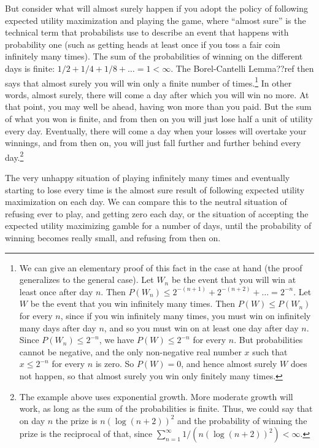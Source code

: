 But consider what will almost surely happen if you adopt the policy of following expected utility maximization and playing the game, where ``almost sure'' is 
the technical term that probabilists use to describe an event that happens with probability one (such as getting heads at least 
once if you toss a fair coin infinitely many times). The sum of the probabilities of winning on the different days is finite: 
$1/2+1/4+1/8+\dots=1<\infty$. The Borel-Cantelli Lemma??ref then says that almost surely you will win only a finite number of times.\footnote{We 
can give an elementary proof of this fact in the case at hand (the proof generalizes to the general case). Let $W_n$ be the event that you will win at least once after day $n$. 
Then $P(W_n)\le 2^{-(n+1)}+2^{-(n+2)}+\dots = 2^{-n}$. Let $W$ be the event that you win infinitely many times. Then $P(W)\le P(W_n)$ for
every $n$, since if you win infinitely many times, you must win on infinitely many days after day $n$, and so you must win on at least one
day after day $n$. Since $P(W_n) \le 2^{-n}$, we have $P(W) \le 2^{-n}$ for every $n$. But probabilities cannot be negative, and the only 
non-negative real number $x$ such that $x \le 2^{-n}$ for every $n$ is zero. So $P(W)=0$, and hence almost surely $W$ does not happen,
so that almost surely you win only finitely many times.} In other words, almost surely, there will come a day after which you will win no more. At that point, you may well be ahead,
having won more than you paid. But the sum of what you won is finite, and from then on you will just lose half a unit of utility every 
day. Eventually, there will come a day when your losses will overtake your winnings, and from then on, you will just fall further and further
behind every day.\footnote{The example above uses exponential growth. More moderate growth will work, as long as the sum of the probabilities
is finite. Thus, we could say that on day $n$ the prize is $n (\log (n+2))^2$ and the probability of winning the prize is the reciprocal
of that, since $\sum_{n=1}^\infty 1/(n (\log (n+2))^2)<\infty$.}

The very unhappy situation of playing infinitely many times and eventually starting to lose every time is the almost 
sure result of following expected utility maximization on each day. We can compare this to the neutral situation of 
refusing ever to play, and getting zero each day, or the situation of accepting the expected utility maximizing gamble
for a number of days, until the probability of winning becomes really small, and refusing from then on.

